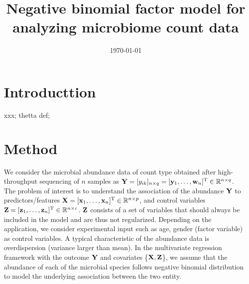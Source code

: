 \documentclass[12pt]{article}
\title{Negative binomial factor model for analyzing microbiome count data}
\author{}
\date{\today}
\def\trans{^{\rm T}}
\newcommand{\cb}{\color{blue}}
\begin{document}
\sloppy
\maketitle

\section{Introducttion}\label{sec:intro}
{\cb xxx; thetta def; }
\section{Method}\label{sec:method}
We consider the microbial abundance data of count type obtained after high-throughput sequencing of $n$ samples as $\Y = [y_{ik}]_{n \times q}   = [\y_1,\ldots,\w_n]\trans \in\mathbb{R}^{n\times q}$. The problem of interest is to understand the association of the abundance ${\bf Y}$ to  predictors/features $\X =[\x_1,\ldots,\x_n]\trans \in \mathbb{R}^{n\times p}$, and control variables $\Z =  [\z_1,\ldots,\z_n]\trans \in \mathbb{R}^{n\times c}$. {\cb ${\bf Z}$ consists of a set of variables that should always be included in the model and are thus not regularized. Depending on the application, we consider experimental input such as age, gender (factor variable) as control variables.} A typical characteristic of the abundance data is overdispersion (variance larger than mean). 
In the multivariate regression framework with the outcome  ${\bf Y}$  and covariates \{${\bf X}, {\bf Z}$\}, we  assume that the abundance of each of the  microbial species  follows  negative binomial distribution to model the underlying association between the two entity.   
\end{document}
